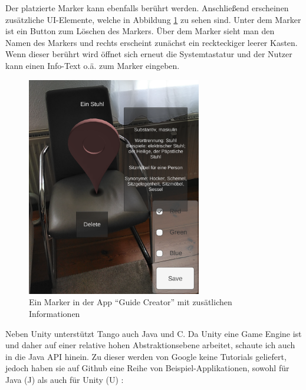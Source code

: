 Der platzierte Marker kann ebenfalls berührt werden. Anschließend erscheinen zusätzliche UI-Elemente, welche in Abbildung \ref{example_app_tango_unity} zu sehen sind. Unter dem Marker ist ein Button zum Löschen des Markers. Über dem Marker sieht man den Namen des Markers und rechts erscheint zunächst ein reckteckiger leerer Kasten. Wenn dieser berührt wird öffnet sich erneut die Systemtastatur und der Nutzer kann einen Info-Text o.ä. zum Marker eingeben.

\begin{figure}[h]
	\centering
	\includegraphics[width=3in]{pictures/chair}
	\caption{Ein Marker in der App "`Guide Creator"' mit zusätlichen Informationen}
	\label{example_app_tango_unity}
\end{figure}
Neben Unity unterstützt Tango auch Java und C. Da Unity eine Game Engine ist und daher auf einer relative hohen Abstraktionsebene arbeitet, schaute ich auch in die Java API hinein. Zu dieser werden von Google keine Tutorials geliefert, jedoch haben sie auf Github eine Reihe von Beispiel-Applikationen, sowohl für Java (J)  \cite{tango_java_github} als auch für Unity (U) \cite{tango_unity_github}:

